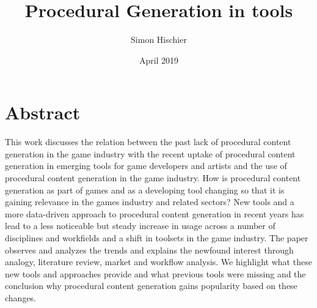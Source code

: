\documentclass[10pt,a4paper]{article}
\title{Procedural Generation in tools}
\author{Simon Hischier}
\date{April 2019}
\begin{document}



\renewcommand{\contentsname}{Inhalt}
\tableofcontents
\newpage

\section{Abstract}
\label{sec:abstract}
\begin{multicols}{2}
This work discusses the relation between the past lack of procedural content generation in the game industry with the recent uptake of procedural content generation in emerging tools for game developers and artists and the use of procedural content generation in the game industry. How is procedural content generation as part of games and as a developing tool changing so that it is gaining relevance in the games industry and related sectors? New tools and a more data-driven approach to procedural content generation in recent years has lead to a less noticeable but steady increase in usage across a number of disciplines and workfields and a shift in toolsets in the game industry. The paper observes and analyzes the trends and explains the newfound interest through analogy, literature review, market and workflow analysis. We highlight what these new tools and approaches provide and what previous tools were missing and the conclusion why procedural content generation gains popularity based on these changes.
\end{multicols}
\end{document}
